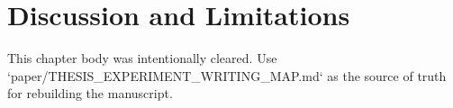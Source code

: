 \chapter{Discussion and Limitations}
\label{ch:discussion}

This chapter body was intentionally cleared. Use `paper/THESIS_EXPERIMENT_WRITING_MAP.md` as the source of truth for rebuilding the manuscript.
